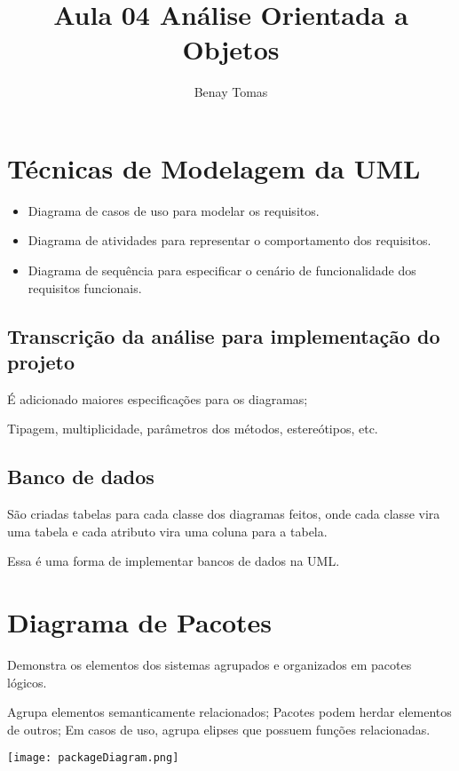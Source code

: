\documentclass{article}
\title{Aula 04 Análise Orientada a Objetos}
\author{Benay Tomas}
\begin{document}
\selectfont

\maketitle

\thispagestyle{empty}



\section*{Técnicas de Modelagem da UML}
\begin{itemize}
    \item Diagrama de casos de uso para modelar os requisitos.
    \item Diagrama de atividades para representar o comportamento dos requisitos.
    \item Diagrama de sequência para especificar
    o cenário de funcionalidade dos 
    requisitos funcionais.
\end{itemize}

\subsection*{Transcrição da análise para implementação do projeto}
É adicionado maiores especificações
para os diagramas; 

Tipagem, multiplicidade,
parâmetros dos métodos, estereótipos, etc.

\subsection*{Banco de dados}
São criadas tabelas para cada classe
dos diagramas feitos, onde cada classe
vira uma tabela e cada atributo vira uma coluna
para a tabela.

Essa é uma forma de implementar bancos
de dados na UML.

\section{Diagrama de Pacotes}
Demonstra os elementos dos sistemas agrupados
e organizados em pacotes lógicos.

Agrupa elementos semanticamente
relacionados; Pacotes podem herdar
elementos de outros; Em casos de uso,
agrupa elipses que possuem funções relacionadas.

\begin{center}
\texttt{[image: packageDiagram.png]}
\end{center}
\end{document}
